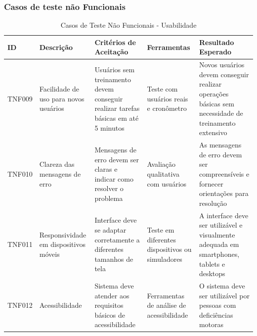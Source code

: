 \documentclass[
	12pt,				%
	openany,			%
	twoside,			%
	a4paper,			%
	english,			%
	brazil				%
	]{abntex2}
\begin{document}
\subsubsection{Casos de teste não Funcionais}
\FloatBarrier
\begin{table}[htbp]
\centering
\caption{Casos de Teste Não Funcionais - Usabilidade}
\begin{tabular}{|p{1.3cm}|p{3.3cm}|p{3.5cm}|p{2.5cm}|p{4.5cm}|}
\hline
\textbf{ID} & \textbf{Descrição} & \textbf{Critérios de Aceitação} & \textbf{Ferramentas} & \textbf{Resultado Esperado} \\
\hline
TNF009 & Facilidade de uso para novos usuários & Usuários sem treinamento devem conseguir realizar tarefas básicas em até 5 minutos & Teste com usuários reais e cronômetro & Novos usuários devem conseguir realizar operações básicas sem necessidade de treinamento extensivo \\
\hline
TNF010 & Clareza das mensagens de erro & Mensagens de erro devem ser claras e indicar como resolver o problema & Avaliação qualitativa com usuários & As mensagens de erro devem ser compreensíveis e fornecer orientações para resolução \\
\hline
TNF011 & Responsividade em dispositivos móveis & Interface deve se adaptar corretamente a diferentes tamanhos de tela & Teste em diferentes dispositivos ou simuladores & A interface deve ser utilizável e visualmente adequada em smartphones, tablets e desktops \\
\hline
TNF012 & Acessibilidade & Sistema deve atender aos requisitos básicos de acessibilidade  & Ferramentas de análise de acessibilidade & O sistema deve ser utilizável por pessoas com deficiências motoras \\
\hline
\end{tabular}
\end{table}
\end{document}
